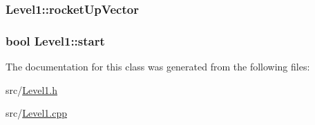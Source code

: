 \hypertarget{class_level1_af64a6427f0f7ac73ee16d1d6d4bc3162}{
\subsubsection[{rocket\-Up\-Vector}]{ Level1\-::rocket\-Up\-Vector}}\label{class_level1_af64a6427f0f7ac73ee16d1d6d4bc3162}
\hypertarget{class_level1_a7ccfe53965cd6952089cad249f0e593f}{
\subsubsection[{start}]{\setlength{\rightskip}{0pt plus 5cm}bool Level1\-::start}}\label{class_level1_a7ccfe53965cd6952089cad249f0e593f}


The documentation for this class was generated from the following files\-:\begin{DoxyCompactItemize}
\item 
src/\hyperlink{_level1_8h}{Level1.\-h}\item 
src/\hyperlink{_level1_8cpp}{Level1.\-cpp}\end{DoxyCompactItemize}
